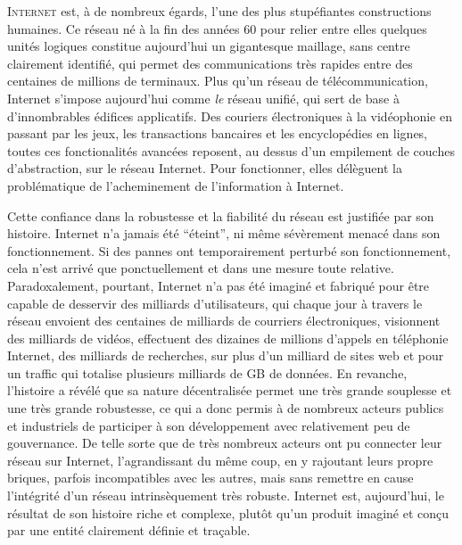 \label{chap:intro}
\introformatting

\lettrine{I}{nternet} est, à de nombreux égards, l'une des plus stupéfiantes
constructions humaines. Ce réseau né à la fin des années 60 pour relier entre
elles quelques unités logiques constitue aujourd'hui un gigantesque maillage,
sans centre clairement identifié, qui permet des communications très rapides
entre des centaines de millions de terminaux\cite{consotium2010isc}. Plus qu'un
réseau de télécommunication, Internet s'impose aujourd'hui comme {\em le} réseau
unifié, qui sert de base à d'innombrables édifices applicatifs. Des couriers
électroniques à la vidéophonie en passant par les jeux, les transactions
bancaires et les encyclopédies en lignes, toutes ces fonctionalités avancées
reposent, au dessus d'un empilement de couches d'abstraction, sur le réseau
Internet. Pour fonctionner, elles délèguent la problématique de l'acheminement
de l'information à Internet.

Cette confiance dans la robustesse et la fiabilité du réseau est justifiée par
son histoire. Internet n'a jamais été ``éteint'', ni même sévèrement menacé dans
son fonctionnement. Si des pannes ont temporairement perturbé son
fonctionnement, cela n'est arrivé que ponctuellement et dans une mesure toute
relative. Paradoxalement, pourtant, Internet n'a pas été imaginé et fabriqué
pour être capable de desservir des milliards d'utilisateurs, qui chaque jour à
travers le réseau envoient des centaines de milliards de courriers
électroniques, visionnent des milliards de vidéos, effectuent des dizaines de
millions d'appels en téléphonie Internet, des milliards de recherches, sur plus
d'un milliard de sites web et pour un traffic qui totalise plusieurs milliards
de GB de données\cite{internetlivestats}. En revanche, l'histoire a révélé que
sa nature décentralisée permet une très grande souplesse et une très grande
robustesse, ce qui a donc permis à de nombreux acteurs publics et industriels de
participer à son développement avec relativement peu de gouvernance. De telle
sorte que de très nombreux acteurs ont pu connecter leur réseau sur Internet,
l'agrandissant du même coup, en y rajoutant leurs propre briques, parfois
incompatibles avec les autres, mais sans remettre en cause l'intégrité d'un
réseau intrinsèquement très robuste. Internet est, aujourd'hui, le résultat de
son histoire riche et complexe, plutôt qu'un produit imaginé et conçu par une
entité clairement définie et traçable.

